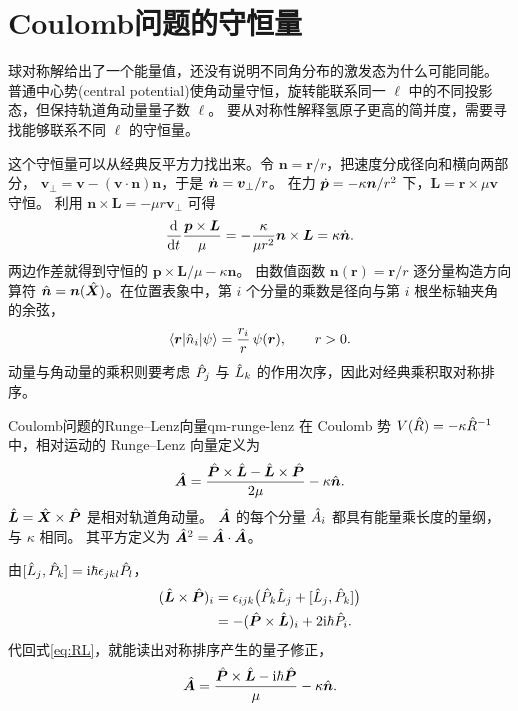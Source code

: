\section{Coulomb问题的守恒量}
球对称解给出了一个能量值，还没有说明不同角分布的激发态为什么可能同能。
普通中心势(central potential)使角动量守恒，旋转能联系同一 $\ell$ 中的不同投影态，但保持轨道角动量量子数 $\ell$。
要从对称性解释氢原子更高的简并度，需要寻找能够联系不同 $\ell$ 的守恒量。

这个守恒量可以从经典反平方力找出来。令 $\bm n = \bm r/r$，把速度分成径向和横向两部分，
$\bm v_\perp = \bm v - (\bm v \cdot \bm n)\bm n$，于是 $\dot{\bm{n}} = \bm v_\perp/r$。
在力 $\dot{\bm{p}} = -\kappa\bm n/r^2$ 下，$\bm L = \bm r \times \mu\bm v$ 守恒。
利用 $\bm n \times \bm L = -\mu r\bm v_\perp$ 可得
\[
    \frac{\mathop{}\!\mathrm{d}^{}}{\mathrm{d}{t}^{}}\frac{\bm p \times \bm L}{\mu}
       = -\frac{\kappa}{\mu r^2}\bm n \times \bm L
       = \kappa\dot{\bm{n}}.
\]
两边作差就得到守恒的 $\bm p \times \bm L/\mu - \kappa\bm n$。
由数值函数 $\bm n(\bm r) = \bm r/r$ 逐分量构造方向算符 $\hat{\bm{n}} = \bm n(\hat{\bm{X}})$。在位置表象中，第 $i$ 个分量的乘数是径向与第 $i$ 根坐标轴夹角的余弦，
\[
    \langle\bm r\vert\hat{n}_i\vert\psi\rangle = \frac{r_i}{r}\,\psi(\bm r),\qquad r > 0.
\]
动量与角动量的乘积则要考虑 $\hat{P}_j$ 与 $\hat{L}_k$ 的作用次序，因此对经典乘积取对称排序。
\begin{definition}{Coulomb问题的Runge--Lenz向量}{qm-runge-lenz}
    在 Coulomb 势 $V(\hat{R}) = -\kappa\hat{R}^{-1}$ 中，相对运动的 Runge--Lenz 向量定义为
    \begin{equation}
        \hat{\bm{A}} = \frac{\hat{\bm{P}} \times \hat{\bm{L}} - \hat{\bm{L}} \times \hat{\bm{P}}}{2\mu}
        - \kappa\hat{\bm{n}}.
        \label{eq:RL}
    \end{equation}
    $\hat{\bm{L}} = \hat{\bm{X}} \times \hat{\bm{P}}$ 是相对轨道角动量。
    $\hat{\bm{A}}$ 的每个分量 $\hat{A}_i$ 都具有能量乘长度的量纲，与 $\kappa$ 相同。
    其平方定义为 $\hat{\bm{A}}^2 = \hat{\bm{A}} \cdot \hat{\bm{A}}$。
\end{definition}
由$[\hat{L}_j,\hat{P}_k] = \mathrm{i}\hbar\epsilon_{jkl}\hat{P}_l$，
\[
    \begin{alignedat}{1}
        (\hat{\bm{L}} \times \hat{\bm{P}})_i &= \epsilon_{ijk}\bigl(\hat{P}_k\hat{L}_j + [\hat{L}_j,\hat{P}_k]\bigr)\\
        &= -(\hat{\bm{P}} \times \hat{\bm{L}})_i + 2\mathrm{i}\hbar \hat{P}_i.
    \end{alignedat}
\]
代回式\eqref{eq:RL}，就能读出对称排序产生的量子修正，
\begin{equation}
    \hat{\bm{A}} = \frac{\hat{\bm{P}} \times \hat{\bm{L}} - \mathrm{i}\hbar\hat{\bm{P}}}{\mu}
       - \kappa\hat{\bm{n}}.
\end{equation}
